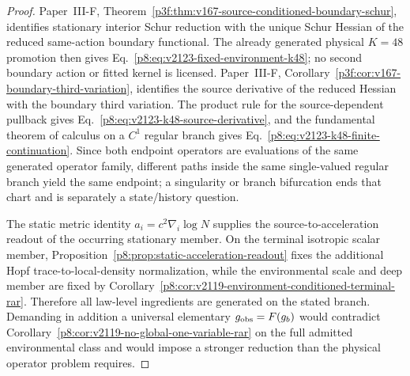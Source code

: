 \documentclass[12pt,a4paper]{article}
\begin{document}
\begin{proof}
Paper~III-F, Theorem~\ref{p3f:thm:v167-source-conditioned-boundary-schur},
identifies stationary interior Schur reduction with the unique Schur Hessian of
the reduced same-action boundary functional.  The already generated physical
$K=48$ promotion then gives Eq.~\eqref{p8:eq:v2123-fixed-environment-k48}; no
second boundary action or fitted kernel is licensed.  Paper~III-F,
Corollary~\ref{p3f:cor:v167-boundary-third-variation}, identifies the source
derivative of the reduced Hessian with the boundary third variation.  The
product rule for the source-dependent pullback gives
Eq.~\eqref{p8:eq:v2123-k48-source-derivative}, and the fundamental theorem of
calculus on a $C^1$ regular branch gives
Eq.~\eqref{p8:eq:v2123-k48-finite-continuation}.  Since both endpoint operators
are evaluations of the same generated operator family, different paths inside
the same single-valued regular branch yield the same endpoint; a singularity
or branch bifurcation ends that chart and is separately a state/history
question.

The static metric identity $a_i=c^2\nabla_i\log N$ supplies the
source-to-acceleration readout of the occurring stationary member.  On the
terminal isotropic scalar member, Proposition~\ref{p8:prop:static-acceleration-readout}
fixes the additional Hopf trace-to-local-density normalization, while the
environmental scale and deep member are fixed by
Corollary~\ref{p8:cor:v2119-environment-conditioned-terminal-rar}.  Therefore
all law-level ingredients are generated on the stated branch.  Demanding in addition a universal
elementary $g_{\rm obs}=F(g_b)$ would contradict
Corollary~\ref{p8:cor:v2119-no-global-one-variable-rar} on the full admitted
environmental class and would impose a stronger reduction than the physical
operator problem requires.
\end{proof}
\end{document}
